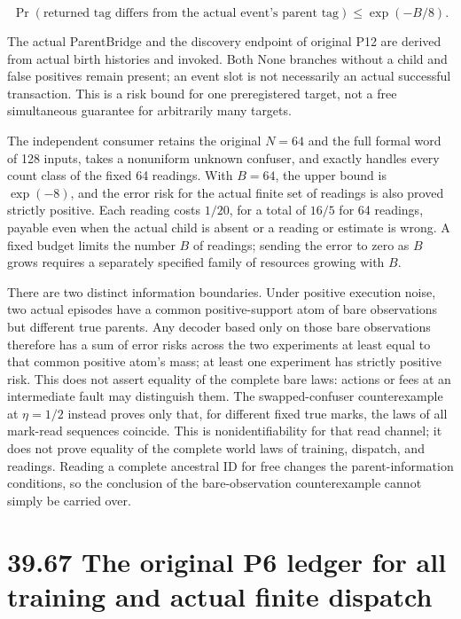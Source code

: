 \documentclass[
  english,
  11pt,
  oneside]{book}
\begin{document}
\[\Pr(\text{returned tag differs from the actual event's parent tag})
\le \exp(-B/8).\]

The actual ParentBridge and the discovery endpoint of original P12 are derived from actual birth histories and invoked. Both None branches without a child and false positives remain present; an event slot is not necessarily an actual successful transaction. This is a risk bound for one preregistered target, not a free simultaneous guarantee for arbitrarily many targets.

The independent consumer retains the original \(N=64\) and the full formal word of 128 inputs, takes a nonuniform unknown confuser, and exactly handles every count class of the fixed 64 readings. With \(B=64\), the upper bound is \(\exp(-8)\), and the error risk for the actual finite set of readings is also proved strictly positive. Each reading costs \(1/20\), for a total of \(16/5\) for 64 readings, payable even when the actual child is absent or a reading or estimate is wrong. A fixed budget limits the number \(B\) of readings; sending the error to zero as \(B\) grows requires a separately specified family of resources growing with \(B\).

There are two distinct information boundaries. Under positive execution noise, two actual episodes have a common positive-support atom of bare observations but different true parents. Any decoder based only on those bare observations therefore has a sum of error risks across the two experiments at least equal to that common positive atom's mass; at least one experiment has strictly positive risk. This does not assert equality of the complete bare laws: actions or fees at an intermediate fault may distinguish them. The swapped-confuser counterexample at \(\eta=1/2\) instead proves only that, for different fixed true marks, the laws of all mark-read sequences coincide. This is nonidentifiability for that read channel; it does not prove equality of the complete world laws of training, dispatch, and readings. Reading a complete ancestral ID for free changes the parent-information conditions, so the conclusion of the bare-observation counterexample cannot simply be carried over.

\section{39.67 The original P6 ledger for all training and actual finite dispatch}\label{the-original-p6-ledger-for-all-training-and-actual-finite-dispatch}
\end{document}
